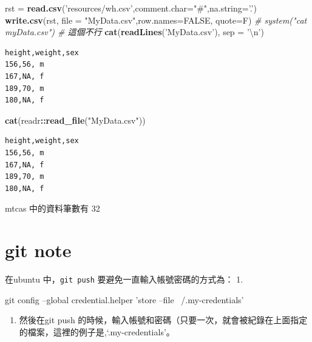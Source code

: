 \documentclass[]{book}
\newenvironment{Shaded}{\begin{snugshade}}{\end{snugshade}}
\newcommand{\CharTok}[1]{\textcolor[rgb]{0.31,0.60,0.02}{#1}}
\newcommand{\CommentTok}[1]{\textcolor[rgb]{0.56,0.35,0.01}{\textit{#1}}}
\newcommand{\DataTypeTok}[1]{\textcolor[rgb]{0.13,0.29,0.53}{#1}}
\newcommand{\FunctionTok}[1]{\textcolor[rgb]{0.00,0.00,0.00}{#1}}
\newcommand{\KeywordTok}[1]{\textcolor[rgb]{0.13,0.29,0.53}{\textbf{#1}}}
\newcommand{\NormalTok}[1]{#1}
\newcommand{\OperatorTok}[1]{\textcolor[rgb]{0.81,0.36,0.00}{\textbf{#1}}}
\newcommand{\OtherTok}[1]{\textcolor[rgb]{0.56,0.35,0.01}{#1}}
\newcommand{\StringTok}[1]{\textcolor[rgb]{0.31,0.60,0.02}{#1}}
\providecommand{\tightlist}{%
  \setlength{\itemsep}{0pt}\setlength{\parskip}{0pt}}
\theoremstyle{definition}
\theoremstyle{definition}
\theoremstyle{definition}
\theoremstyle{remark}
\begin{document}
\begin{Shaded}
\begin{Highlighting}[]
\NormalTok{rst =}\StringTok{ }\KeywordTok{read.csv}\NormalTok{(}\StringTok{'resources/wh.csv'}\NormalTok{,}\DataTypeTok{comment.char=}\StringTok{"#"}\NormalTok{,}\DataTypeTok{na.string=}\StringTok{'.'}\NormalTok{)}
\KeywordTok{write.csv}\NormalTok{(rst, }\DataTypeTok{file =} \StringTok{"MyData.csv"}\NormalTok{,}\DataTypeTok{row.names=}\OtherTok{FALSE}\NormalTok{, }\DataTypeTok{quote=}\NormalTok{F)}
\CommentTok{# system("cat myData.csv") # 這個不行}
\KeywordTok{cat}\NormalTok{(}\KeywordTok{readLines}\NormalTok{(}\StringTok{'MyData.csv'}\NormalTok{), }\DataTypeTok{sep =} \StringTok{'}\CharTok{\textbackslash{}n}\StringTok{'}\NormalTok{)}
\end{Highlighting}
\end{Shaded}

\begin{verbatim}
height,weight,sex
156,56, m
167,NA, f
189,70, m
180,NA, f
\end{verbatim}

\begin{Shaded}
\begin{Highlighting}[]
\KeywordTok{cat}\NormalTok{(readr}\OperatorTok{::}\KeywordTok{read_file}\NormalTok{(}\StringTok{"MyData.csv"}\NormalTok{))}
\end{Highlighting}
\end{Shaded}

\begin{verbatim}
height,weight,sex
156,56, m
167,NA, f
189,70, m
180,NA, f
\end{verbatim}

mtcas 中的資料筆數有 32

\hypertarget{git-note}{%
\chapter{git note}\label{git-note}}

在ubuntu 中，\texttt{git\ push} 要避免一直輸入帳號密碼的方式為： 1.

\begin{Shaded}
\begin{Highlighting}[]
\FunctionTok{git}\NormalTok{ config --global credential.helper }\StringTok{'store --file ~/.my-credentials'}
\end{Highlighting}
\end{Shaded}

\begin{enumerate}
\def\labelenumi{\arabic{enumi}.}
\setcounter{enumi}{1}
\tightlist
\item
  然後在git push
  的時候，輸入帳號和密碼（只要一次，就會被紀錄在上面指定的檔案，這裡的例子是,`.my-credentials'。
\end{enumerate}
\end{document}
